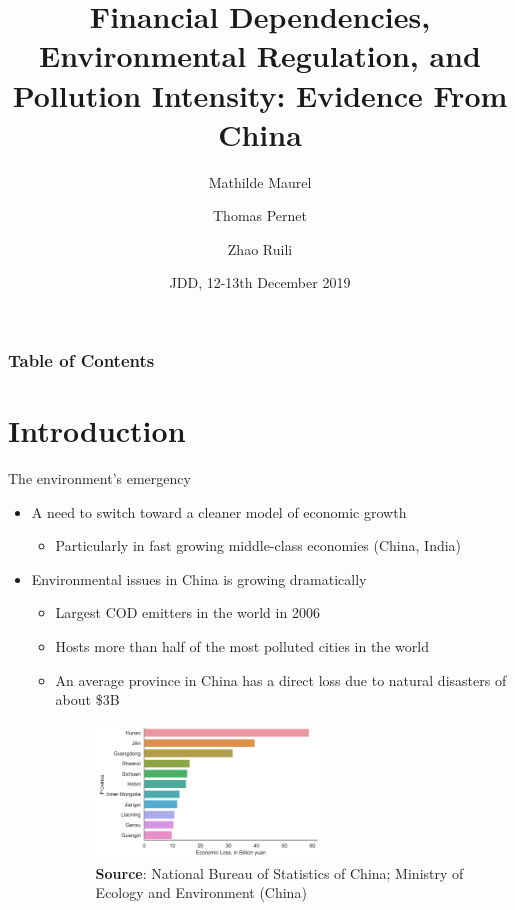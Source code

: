 \documentclass{beamer}
\title[Paper banks and environment] %
{Financial Dependencies, Environmental Regulation, and Pollution Intensity: Evidence From China}
\author[] %
{Mathilde Maurel\inst{1, 2} \and Thomas Pernet\inst{1} \and Zhao Ruili\inst{3}}
\institute[] %
{
  \inst{1}%
  CNRS, France
  \and
  \inst{2}%
  Centre d'Economie de la Sorbonne, Université Paris 1 Panthéon-Sorbonne, France
  \and
  \inst{3}%
  Shanghai University of International Business and Economics, China
}
\date[] %
{JDD, 12-13th December 2019}
\begin{document}
\frame{\titlepage}

\begin{frame}

\frametitle{Table of Contents}
\tableofcontents
\end{frame}

\section{Introduction}

\begin{framefont}{\small}{\footnotesize}{\footnotesize}
    \begin{frame}{The environment's emergency}
        \begin{itemize}
            \item{A need to switch toward a cleaner model of economic growth}
                \begin{itemize}
                    \item{Particularly in fast growing middle-class economies (China, India)}
                \end{itemize}
            \item{Environmental issues in China is growing dramatically}
                \begin{itemize}
                    \item{Largest COD emitters in the world in 2006}
                    \item{Hosts more than half of the most polluted cities in the world}
                    \item{An average province in China has a direct loss due to natural disasters of about \$3B}
                    \begin{figure}[ht]
                        \centering
                        \textbf{}\par\medskip
                        \includegraphics[width=0.6\textwidth]{Econ_loss_presentation.png}\\
                       \scriptsize \textbf{Source}: National Bureau of Statistics of China; Ministry of Ecology and Environment (China)
                    \end{figure}
            \end{itemize}
        \end{itemize}
    \end{frame}
\end{framefont}
\end{document}
